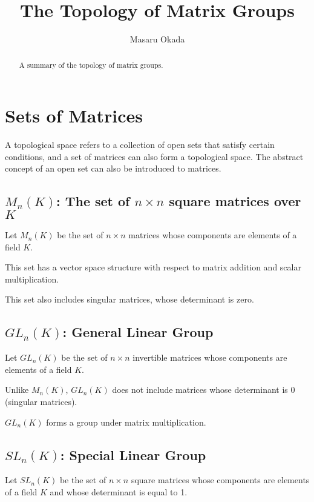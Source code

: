 \documentclass[uplatex,a4j,12pt,dvipdfmx]{jsarticle}
\title{
\textbf{The Topology of Matrix Groups}
}
\author{
Masaru Okada
}
\begin{document}
\maketitle


\begin{abstract}
	A summary of the topology of matrix groups.
\end{abstract}

\section{Sets of Matrices}

A topological space refers to a collection of open sets that satisfy certain conditions, and a set of matrices can also form a topological space.
The abstract concept of an open set can also be introduced to matrices.

\subsection{\textbf{$M_{n}(K)$: The set of $n \times n$ square matrices over $K$}}

Let $M_{n}(K)$ be the set of $n \times n$ matrices whose components are elements of a field $K$.

This set has a vector space structure with respect to matrix addition and scalar multiplication.

This set also includes singular matrices, whose determinant is zero.

\subsection{\textbf{$GL_{n}(K)$: General Linear Group}}

Let $GL_{n}(K)$ be the set of $n \times n$ invertible matrices whose components are elements of a field $K$.

Unlike $M_{n}(K)$, $GL_{n}(K)$ does not include matrices whose determinant is 0 (singular matrices).

$GL_{n}(K)$ forms a group under matrix multiplication.

\subsection{\textbf{$SL_{n}(K)$: Special Linear Group}}

Let $SL_{n}(K)$ be the set of $n \times n$ square matrices whose components are elements of a field $K$ and whose determinant is equal to 1.
\end{document}
